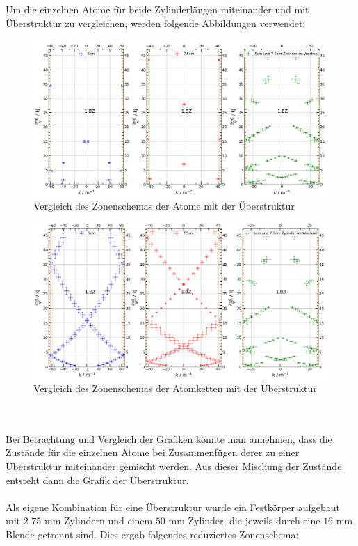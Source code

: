 \documentclass[german,  %
parskip=full,  %
]{scrartcl}
\begin{document}
Um die einzelnen Atome für beide Zylinderlängen miteinander und mit Überstruktur zu vergleichen, werden folgende Abbildungen verwendet:
\begin{figure}[h!]
\centering
\includegraphics[width=\textwidth]{4632_Vergleich_mit_Atomen.png}
\caption{Vergleich des Zonenschemas der Atome mit der Überstruktur}
\end{figure}
\begin{figure}[h!]
\centering
\includegraphics[width=\textwidth]{4632_Vergleich_mit_Atomketten.png}
\caption{Vergleich des Zonenschemas der Atomketten mit der Überstruktur}
\end{figure}
\\\\
Bei Betrachtung und Vergleich der Grafiken könnte man annehmen, dass die Zustände für die einzelnen Atome bei Zusammenfügen derer zu einer Überstruktur miteinander gemischt werden. Aus dieser Mischung der Zustände entsteht dann die Grafik der Überstruktur.
\\\\
Als eigene Kombination für eine Überstruktur wurde ein Festkörper aufgebaut mit 2 $75$ mm Zylindern und einem $50$ mm Zylinder, die jeweils durch eine $16$ mm Blende getrennt sind. Dies ergab folgendes reduziertes Zonenschema:
\end{document}
